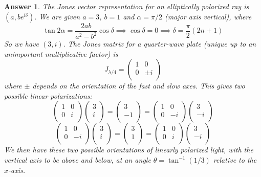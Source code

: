 \documentclass[a4paper]{article}
\newtheorem{ans}{Answer}[section]
\theoremstyle{new}
\begin{document}
\begin{ans}
The Jones vector representation for an elliptically polarized ray is $(a,be^{i\delta})$. We are given $a=3$, $b=1$ and $\alpha=\pi/2$ (major axis vertical), where
$$\tan2\alpha=\frac{2ab}{a^2-b^2}\cos\delta\implies\cos\delta=0\implies\delta=\frac{\pi}{2}(2n+1)$$
So we have $(3,i)$. The Jones matrix for a quarter-wave plate (unique up to an unimportant multiplicative factor) is
$$J_{\lambda/4}=\begin{pmatrix}1&0\\0&\pm i\\\end{pmatrix}$$
where $\pm$ depends on the orientation of the fast and slow axes. This gives two possible linear polarizations:
$$\begin{pmatrix}1&0\\0&i\\\end{pmatrix}\begin{pmatrix}3\\i\\\end{pmatrix}=\begin{pmatrix}3\\-1\\\end{pmatrix}=\begin{pmatrix}1&0\\0&-i\\\end{pmatrix}\begin{pmatrix}3\\-i\\\end{pmatrix}$$
$$\begin{pmatrix}1&0\\0&-i\\\end{pmatrix}\begin{pmatrix}3\\i\\\end{pmatrix}=\begin{pmatrix}3\\1\\\end{pmatrix}=\begin{pmatrix}1&0\\0&i\\\end{pmatrix}\begin{pmatrix}3\\-i\\\end{pmatrix}$$
We then have these two possible orientations of linearly polarized light, with the vertical axis to be above and below, at an angle $\theta=\tan^{-1}(1/3)$ relative to the $x$-axis.
\end{ans}
\end{document}
